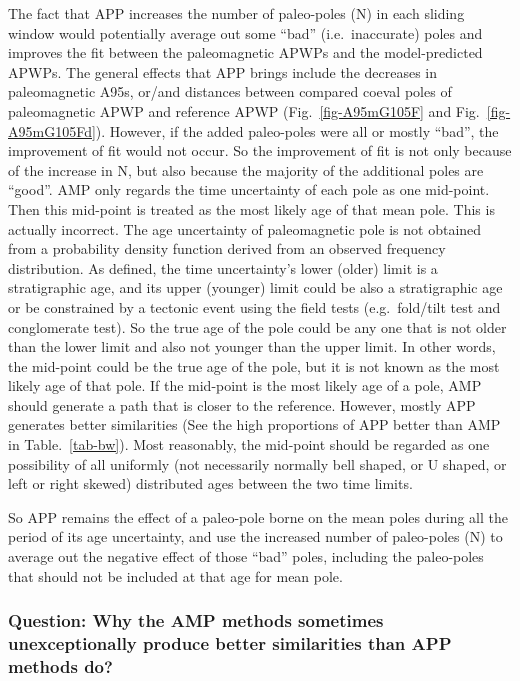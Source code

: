The fact that APP increases the number of paleo-poles (N) in each sliding window
would potentially average out some ``bad'' (i.e.\ inaccurate) poles and improves
the fit between the paleomagnetic APWPs and the model-predicted APWPs. The
general effects that APP brings include the decreases in paleomagnetic A95s,
or/and distances between compared coeval poles of paleomagnetic APWP and
reference APWP (Fig.~\ref{fig-A95mG105F} and Fig.~\ref{fig-A95mG105Fd}).
However, if the added paleo-poles were all or mostly ``bad'', the improvement of
fit would not occur. So the improvement of fit is not only because of the
increase in N, but also because the majority of the additional poles are
``good''. AMP only regards the time uncertainty of each pole as one mid-point.
Then this mid-point is treated as the most likely age of that mean pole. This is
actually incorrect. The age uncertainty of paleomagnetic pole is not obtained
from a probability density function derived from an observed frequency
distribution. As defined, the time uncertainty's lower (older) limit is a
stratigraphic age, and its upper (younger) limit could be also a stratigraphic
age or be constrained by a tectonic event using the field tests (e.g.\ fold/tilt
test and conglomerate test). So the true age of the pole could be any one that
is not older than the lower limit and also not younger than the upper limit. In
other words, the mid-point could be the true age of the pole, but it is not
known as the most likely age of that pole. If the mid-point is the most likely
age of a pole, AMP should generate a path that is closer to the reference.
However, mostly APP generates better similarities (See the high proportions of
APP better than AMP in Table.~\ref{tab-bw}). Most reasonably, the mid-point
should be regarded as one possibility of all uniformly (not necessarily normally
bell shaped, or U shaped, or left or right skewed) distributed ages between the
two time limits.

So APP remains the effect of a paleo-pole borne on the mean poles during all the
period of its age uncertainty, and use the increased number of paleo-poles (N)
to average out the negative effect of those ``bad'' poles, including the
paleo-poles that should not be included at that age for mean pole.

\subsubsection{Question: Why the AMP methods sometimes unexceptionally produce
better similarities than APP methods do?}

